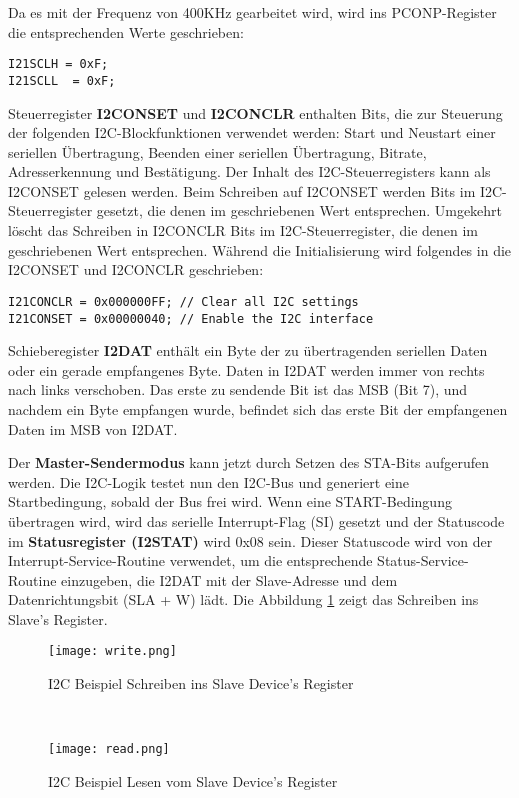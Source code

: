 Da es mit der Frequenz von 400KHz gearbeitet wird, wird ins PCONP-Register die entsprechenden Werte geschrieben:
\begin{lstlisting}
I21SCLH = 0xF;
I21SCLL  = 0xF;
\end{lstlisting}

Steuerregister \textbf{I2CONSET} und \textbf{I2CONCLR} enthalten Bits, die zur Steuerung der folgenden I2C-Blockfunktionen verwendet werden: Start und Neustart einer seriellen Übertragung, Beenden einer seriellen Übertragung, Bitrate, Adresserkennung und Bestätigung. Der Inhalt des I2C-Steuerregisters kann als I2CONSET gelesen werden. Beim Schreiben auf I2CONSET werden Bits im I2C-Steuerregister gesetzt, die denen im geschriebenen Wert entsprechen. Umgekehrt löscht das Schreiben in I2CONCLR Bits im I2C-Steuerregister, die denen im geschriebenen Wert entsprechen. Während die Initialisierung wird folgendes in die I2CONSET und I2CONCLR geschrieben: 

\begin{lstlisting}
I21CONCLR = 0x000000FF; // Clear all I2C settings
I21CONSET = 0x00000040; // Enable the I2C interface
\end{lstlisting}

Schieberegister \textbf{I2DAT} enthält ein Byte der zu übertragenden seriellen Daten oder ein gerade empfangenes Byte. Daten in I2DAT werden immer von rechts nach links verschoben. Das erste zu sendende Bit ist das MSB (Bit 7), und nachdem ein Byte empfangen wurde, befindet sich das erste Bit der empfangenen Daten im MSB von I2DAT. 

Der \textbf{Master-Sendermodus} kann jetzt durch Setzen des STA-Bits aufgerufen werden. Die I2C-Logik testet nun den I2C-Bus und generiert eine Startbedingung, sobald der Bus frei wird. Wenn eine START-Bedingung übertragen wird, wird das serielle Interrupt-Flag (SI) gesetzt und der Statuscode im \textbf{Statusregister (I2STAT)} wird 0x08 sein. Dieser Statuscode wird von der Interrupt-Service-Routine verwendet, um die entsprechende Status-Service-Routine einzugeben, die I2DAT mit der Slave-Adresse und dem Datenrichtungsbit (SLA + W) lädt. Die Abbildung \ref{fig:write} zeigt das Schreiben ins Slave's Register.
\begin{figure}[!hb]
	\centering
	\texttt{[image: write.png]}
	\caption[I2C Beispiel Schreiben ins Slave Device's Register]{I2C Beispiel Schreiben ins Slave Device's Register}
	\label{fig:write}
\end{figure}\\
\begin{figure}[!hb]
	\centering
	\texttt{[image: read.png]}
	\caption[I2C Beispiel Lesen vom Slave Device's Register]{I2C Beispiel Lesen vom Slave Device's Register}
	\label{fig:read}
\end{figure}\\

